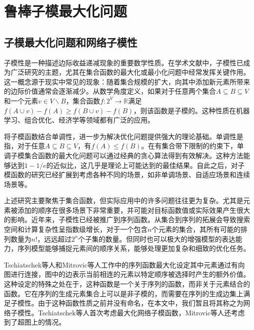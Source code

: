 \section{鲁棒子模最大化问题}
\label{sec:2_2}

\subsection{子模最大化问题和网络子模性}

子模性是一种描述边际收益递减现象的重要数学性质。在学术文献中，子模性已成为广泛研究的主题，尤其在集合函数的最大化或最小化问题中经常发挥关键作用\cite{nemhauser1978best,khuller1999budgeted}。这一概念源于现实中常见的现象：随着集合规模的扩大，向其中添加新元素所带来的边际价值通常会逐渐减少。从数学角度定义，如果对于任意两个集合$A\subseteq B \subseteq V$和一个元素$v\in V\backslash B$，集合函数$f: 2^V \to \mathbb{R}$满足$f(A\cup v) - f(A) \ge f(B\cup v) -f(B)$，则该函数是子模的。这种性质在机器学习、组合优化、经济学等领域都有广泛的应用\cite{krause2005near,lin2011class,shi2021profit,kirchhoff2014submodularity,gabillon2013adaptive,kempe2003maximizing,wang2021efficient}。

将子模函数结合单调性，进一步为解决优化问题提供强大的理论基础。单调性是指，对于任意$A\subseteq B\subseteq V$，有$f(A)\le f(B)$。在有集合带下限制的约束下，单调子模集合函数的最大化问题可以通过经典的贪心算法得到有效解决。这种方法能够达到$1−1/e$的近似比\cite{nemhauser1978best}，这几乎是理论上可能达到的最佳结果。自此之后，对子模函数的研究已经扩展到考虑各种不同的场景，如非单调场景、自适应场景和连续场景等\cite{feige2007maximizing,golovin2011adaptive,das2011submodular,bach2019submodular,shi2019adaptive}。

上述研究主要聚焦于集合函数，但实际应用中的许多问题往往更为复杂。尤其是元素被添加的顺序在很多场景下非常重要，并可能对目标函数值或实际效果产生很大的影响。近年来，子模性已经被推广到序列函数\cite{zhang2015string,tschiatschek2017selecting,streeter2008online,zhang2013near}。从集合到序列的拓展会导致搜索空间和计算复杂性呈指数级增长，对于一个包含$n$个元素的集合，其所有可能的排列数量为$n!$，远远超过$2^n$个子集的数量。但同时也可以极大的增强模型的表达能力，序列模型能够捕捉元素间的顺序关系，能够处理更加复杂和细致的优化任务。

Tschiatschek等人\cite{tschiatschek2017selecting}和Mitrovic等人\cite{mitrovic2018submodularity}工作中的序列函数最大化设定其中元素通过有向图进行连接，图中的边表示当前相连的元素以特定顺序被选择时产生的额外价值。这种设定的特殊之处在于，这种函数是一个关于序列的函数，而非关于元素结合的函数。它在序列的生成元素集合上可以是非子模的，而需要在序列的生成边集上满足子模性。由于这种函数性质之前并没有命名，在本文中，我们暂且将其称之为网络子模性。Tschiatschek等人\cite{tschiatschek2017selecting}首次考虑最大化网络子模函数，Mitrovic等人\cite{mitrovic2018submodularity}还考虑到了超图上的情况。

